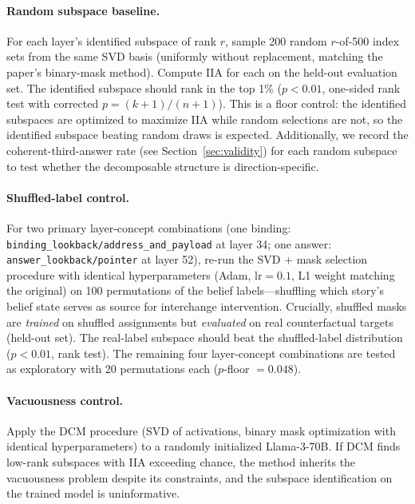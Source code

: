 \documentclass[11pt]{article}
\begin{document}
\paragraph{Random subspace baseline.} For each layer's identified subspace of rank $r$, sample 200 random $r$-of-500 index sets from the same SVD basis (uniformly without replacement, matching the paper's binary-mask method). Compute IIA for each on the held-out evaluation set. The identified subspace should rank in the top 1\% ($p < 0.01$, one-sided rank test with corrected $p = (k + 1)/(n + 1)$). This is a floor control: the identified subspaces are optimized to maximize IIA while random selections are not, so the identified subspace beating random draws is expected. Additionally, we record the coherent-third-answer rate (see Section~\ref{sec:validity}) for each random subspace to test whether the decomposable structure is direction-specific.

\paragraph{Shuffled-label control.} For two primary layer-concept combinations (one binding: \texttt{binding\_lookback/address\_and\_payload} at layer 34; one answer: \texttt{answer\_lookback/pointer} at layer 52), re-run the SVD + mask selection procedure with identical hyperparameters (Adam, $\text{lr} = 0.1$, L1 weight matching the original) on 100 permutations of the belief labels---shuffling which story's belief state serves as source for interchange intervention. Crucially, shuffled masks are \emph{trained} on shuffled assignments but \emph{evaluated} on real counterfactual targets (held-out set). The real-label subspace should beat the shuffled-label distribution ($p < 0.01$, rank test). The remaining four layer-concept combinations are tested as exploratory with 20 permutations each ($p$-floor $= 0.048$).

\paragraph{Vacuousness control.} Apply the DCM procedure (SVD of activations, binary mask optimization with identical hyperparameters) to a randomly initialized Llama-3-70B. If DCM finds low-rank subspaces with IIA exceeding chance, the method inherits the \citet{sutter2025vacuous} vacuousness problem despite its constraints, and the subspace identification on the trained model is uninformative.
\end{document}
